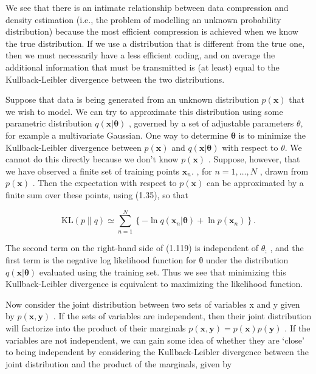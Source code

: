 \documentclass[
  10
]{article}
\begin{document}
We see that there is an intimate relationship between data compression
and density estimation (i.e., the problem of modelling an unknown
probability distribution) because the most efficient compression is
achieved when we know the true distribution. If we use a distribution
that is different from the true one, then we must necessarily have a
less efficient coding, and on average the additional information that
must be transmitted is (at least) equal to the Kullback-Leibler
divergence between the two distributions.

Suppose that data is being generated from an unknown distribution
\(p ( \mathbf { x } )\) that we wish to model. We can try to approximate
this distribution using some parametric distribution
\(q ( \mathbf { x } | \mathbf { \theta } )\) , governed by a set of
adjustable parameters \(\theta ,\) for example a multivariate Gaussian.
One way to determine \(\pmb \theta\) is to minimize the Kullback-Leibler
divergence between \(p ( \mathbf { x } )\) and
\(q ( \mathbf { x } | \mathbf { \theta } )\) with respect to
\(\theta .\) We cannot do this directly because we don't know
\(p ( \mathbf { x } )\) . Suppose, however, that we have observed a
finite set of training points \(\mathbf { x } _ { n } .\) , for
\(n = 1 , \ldots , N\) , drawn from \(p ( \mathbf { x } )\) . Then the
expectation with respect to \(p ( \mathbf { x } )\) can be approximated
by a finite sum over these points, using (1.35), so that

\[
\mathrm{KL} (p \| q) \simeq \sum_ {n = 1} ^ {N} \left\{- \ln q (\mathbf {x} _ {n} | \boldsymbol {\theta}) + \ln p (\mathbf {x} _ {n}) \right\}.\tag{1.119}
\]

The second term on the right-hand side of (1.119) is independent of
\(\theta _ { ; }\) , and the first term is the negative log likelihood
function for θ under the distribution
\(q ( \mathbf { x } | \mathbf { \theta } )\) evaluated using the
training set. Thus we see that minimizing this Kullback-Leibler
divergence is equivalent to maximizing the likelihood function.

Now consider the joint distribution between two sets of variables x and
y given by \(p ( \mathbf x , \mathbf y )\) . If the sets of variables
are independent, then their joint distribution will factorize into the
product of their marginals
\(p ( \mathbf { x } , \mathbf { y } ) = p ( \mathbf { x } ) p ( \mathbf { y } )\)
. If the variables are not independent, we can gain some idea of whether
they are `close' to being independent by considering the
Kullback-Leibler divergence between the joint distribution and the
product of the marginals, given by
\end{document}
